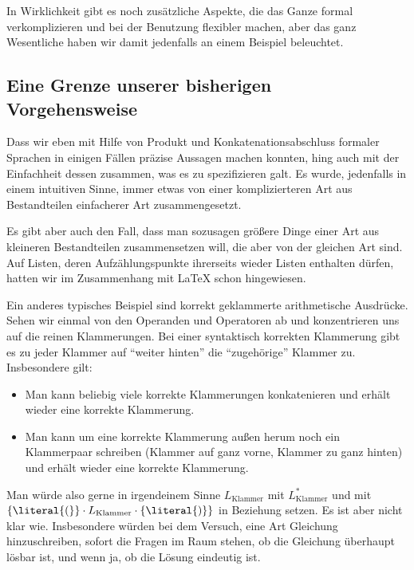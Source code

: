 In Wirklichkeit gibt es noch zusätzliche Aspekte, die das Ganze formal
verkomplizieren und bei der Benutzung flexibler machen, aber das ganz
Wesentliche haben wir damit jedenfalls an einem Beispiel beleuchtet.

%


\subsection{Eine Grenze unserer bisherigen Vorgehensweise}
\label{ssub:rekursive-def}

Dass wir eben mit Hilfe von Produkt und Konkatenationsabschluss formaler
Sprachen in einigen Fällen präzise Aussagen machen konnten, hing auch mit der
Einfachheit dessen zusammen, was es zu spezifizieren galt.
%
Es wurde, jedenfalls in einem intuitiven Sinne, immer etwas von einer
komplizierteren Art aus Bestandteilen einfacherer Art zusammengesetzt.

Es gibt aber auch den Fall, dass man sozusagen größere Dinge einer Art aus
kleineren Bestandteilen zusammensetzen will, die aber von der gleichen Art
sind. Auf Listen, deren Aufzählungspunkte ihrerseits wieder Listen enthalten
dürfen, hatten wir im Zusammenhang mit \LaTeX{} schon hingewiesen.  

Ein anderes typisches Beispiel sind korrekt geklammerte arithmetische
Ausdrücke. Sehen wir einmal von den Operanden und Operatoren ab und
konzentrieren uns auf die reinen Klammerungen.  Bei einer syntaktisch
korrekten Klammerung gibt es zu jeder Klammer auf "`weiter hinten"' die
"`zugehörige"' Klammer zu. Insbesondere gilt:
%
\begin{itemize}
\item Man kann beliebig viele korrekte Klammerungen konkatenieren und
  erhält wieder eine korrekte Klammerung.
\item Man kann um eine korrekte Klammerung außen herum noch ein
  Klammerpaar schreiben (Klammer auf ganz vorne, Klammer zu ganz
  hinten) und erhält wieder eine korrekte Klammerung.
\end{itemize}
%
Man würde also gerne in irgendeinem Sinne $L_{\mathrm{Klammer}}$ mit
$L_{\mathrm{Klammer}}^*$ und mit
$\{\literal{(}\}\cdot L_{\mathrm{Klammer}}\cdot\{\literal{)}\}$ in Beziehung
setzen. Es ist aber nicht klar wie. Insbesondere würden bei dem
Versuch, eine Art Gleichung hinzuschreiben, sofort die Fragen im Raum
stehen, ob die Gleichung überhaupt lösbar ist, und wenn ja, ob die
Lösung eindeutig ist.
 
